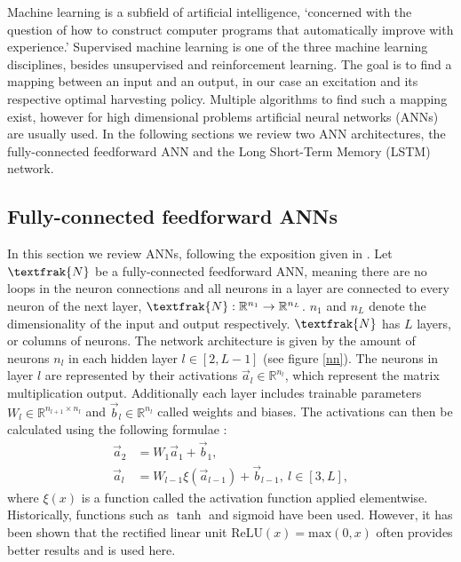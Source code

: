 Machine learning is a subfield of artificial intelligence, `concerned with the question of how to construct computer programs that automatically improve with experience.' \cite{Mitchell97}
Supervised machine learning is one of the three machine learning disciplines, besides unsupervised and reinforcement learning.
The goal is to find a mapping between an input and an output, in our case an excitation and its respective optimal harvesting policy.
Multiple algorithms to find such a mapping exist, however for high dimensional problems artificial neural networks (ANNs) are usually used.
In the following sections we review two ANN architectures, the fully-connected feedforward ANN and the Long Short-Term Memory (LSTM) network.

\subsection{Fully-connected feedforward ANNs}
In this section we review ANNs, following the exposition given in \cite{lu2020dying}.
Let $\textfrak{N}$ be a fully-connected feedforward ANN, meaning there are no loops in the neuron connections and all neurons in a layer are connected to every neuron of the next layer, $\textfrak{N}: \mathbb{R}^{n_1} \to \mathbb{R}^{n_L}$. $n_1$ and $n_L$ denote the dimensionality of the input and output respectively. 
$\textfrak{N}$ has $L$ layers, or columns of neurons.
The network architecture is given by the amount of neurons $n_l$ in each hidden layer $l \in [2, L - 1]$ (see figure \ref{nn}).
The neurons in layer $l$ are represented by their activations $\vec{a}_l \in \mathbb{R}^{n_l}$, which represent the matrix multiplication output. Additionally each layer includes trainable parameters $W_l \in \mathbb{R}^{n_{l+1} \times n_{l}}$ and $\vec{b}_l \in \mathbb{R}^{n_l}$ called weights and biases.
The activations can then be calculated using the following formulae \cite{TN_libero_mab2)53517}:
\begin{align*}
	\vec{a}_2 & = W_1 \vec{a}_1 + \vec{b}_1, \\
	\vec{a}_l & = W_{l-1} \xi(\vec{a}_{l-1}) + \vec{b}_{l-1}, \ l \in [3, L],
\end{align*}
where $\xi(x)$ is a function called the activation function applied elementwise. Historically, functions such as $\tanh$ and sigmoid have been used. However, it has been shown \cite{Maas2013RectifierNI, krizhevsky} that the rectified linear unit $\mathrm{ReLU}(x) = \mathrm{max}(0, x)$ often provides better results and is used here.


